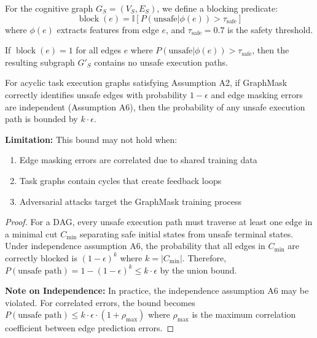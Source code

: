 \documentclass{article}
\begin{document}
\begin{definition}
For the cognitive graph $G_S = (V_S, E_S)$, we define a blocking predicate:
\begin{equation}
\operatorname{block}(e) = \mathbb{I}[P(\text{unsafe} | \phi(e)) > \tau_{\text{safe}}]
\end{equation}
where $\phi(e)$ extracts features from edge $e$, and $\tau_{\text{safe}} = 0.7$ is the safety threshold.
\end{definition}

\begin{lemma}
If $\operatorname{block}(e) = 1$ for all edges $e$ where $P(\text{unsafe} | \phi(e)) > \tau_{\text{safe}}$, then the resulting subgraph $G'_S$ contains no unsafe execution paths.
\end{lemma}

\begin{theorem}
For acyclic task execution graphs satisfying Assumption A2, if GraphMask correctly identifies unsafe edges with probability $1-\epsilon$ and edge masking errors are independent (Assumption A6), then the probability of any unsafe execution path is bounded by $k \cdot \epsilon$.

\textbf{Limitation:} This bound may not hold when:
\begin{enumerate}
\item Edge masking errors are correlated due to shared training data
\item Task graphs contain cycles that create feedback loops
\item Adversarial attacks target the GraphMask training process
\end{enumerate}
\end{theorem}

\begin{proof}
For a DAG, every unsafe execution path must traverse at least one edge in a minimal cut $C_{\min}$ separating safe initial states from unsafe terminal states. Under independence assumption A6, the probability that all edges in $C_{\min}$ are correctly blocked is $(1-\epsilon)^k$ where $k = |C_{\min}|$. Therefore, $P(\text{unsafe path}) = 1-(1-\epsilon)^k \leq k \cdot \epsilon$ by the union bound.

\textbf{Note on Independence:} In practice, the independence assumption A6 may be violated. For correlated errors, the bound becomes $P(\text{unsafe path}) \leq k \cdot \epsilon \cdot (1 + \rho_{\max})$ where $\rho_{\max}$ is the maximum correlation coefficient between edge prediction errors.
\end{proof}
\end{document}

